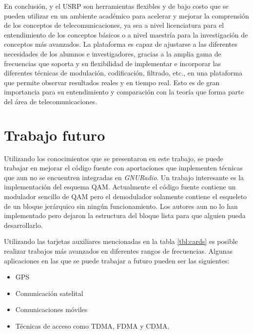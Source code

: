 En conclusi\'on, \gnuradio y el USRP son herramientas flexibles y de bajo costo que se pueden utilizar en un ambiente acad\'emico
para acelerar y mejorar la comprensi\'on de los conceptos de telecomunicaciones, ya sea a nivel licenciatura para el entendimiento
de los conceptos b\'asicos o a nivel maestr\'ia para la investigaci\'on de conceptos m\'as avanzados. La plataforma es capaz de
ajustarse a las diferentes necesidades de los alumnos e investigadores, gracias a la amplia gama de frecuencias que soporta y su
flexibilidad de implementar e incorporar las diferentes t\'ecnicas de modulaci\'on, codificaci\'on, filtrado, etc., en una
plataforma que permite observar resultados reales y en tiempo real. Esto es de gran importancia para su entendimiento y
comparaci\'on con la teor\'ia que forma parte del \'area de telecomunicaciones.

\section{Trabajo futuro}
Utilizando los conocimientos que se presentaron en este trabajo, se puede trabajar en mejorar el c\'odigo fuente con aportaciones
que implementen t\'ecnicas que aun no se encuentren integradas en \emph{GNURadio}. Un trabajo interesante es la implementaci\'on
del esquema QAM. Actualmente el c\'odigo fuente contiene un modulador sencillo de QAM pero el demodulador solamente contiene el
esqueleto de un bloque jer\'arquico sin ning\'un funcionamiento. Los autores aun no lo han implementado pero dejaron la estructura
del bloque lista para que alguien pueda desarrollarlo.

Utilizando las tarjetas auxiliares mencionadas en la tabla \ref{tbl:cards} es posible realizar trabajos m\'as avanzados en
diferentes rangos de frecuencias. Algunas aplicaciones en las que se puede trabajar a futuro pueden ser las siguientes:
\begin{itemize}
  \item GPS
  \item Comunicaci\'on satelital
  \item Comunicaciones m\'oviles
  \item T\'ecnicas de acceso como TDMA, FDMA y CDMA.
\end{itemize}